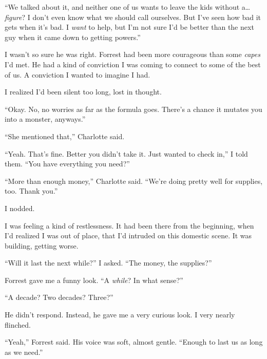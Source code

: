 ``We talked about it, and neither one of us wants to leave the kids without a\ldots \emph{figure}?  I don't even know what we should call ourselves.  But I've seen how bad it gets when it's bad.  I \emph{want} to help, but I'm not sure I'd be better than the next guy when it came down to getting powers.''



I wasn't so sure he was right.  Forrest had been more courageous than some \emph{capes} I'd met.  He had a kind of conviction I was coming to connect to some of the best of us.  A conviction I wanted to imagine I had.



I realized I'd been silent too long, lost in thought.



``Okay.  No, no worries as far as the formula goes.  There's a chance it mutates you into a monster, anyways.''



``She mentioned that,'' Charlotte said.



``Yeah.  That's fine.  Better you didn't take it.  Just wanted to check in,'' I told them.  ``You have everything you need?''



``More than enough money,'' Charlotte said.  ``We're doing pretty well for supplies, too.  Thank you.''



I nodded.



I was feeling a kind of restlessness.  It had been there from the beginning, when I'd realized I was out of place, that I'd intruded on this domestic scene.  It was building, getting worse.



``Will it last the next while?'' I asked.  ``The money, the supplies?''



Forrest gave me a funny look.  ``A \emph{while}?  In what sense?''



``A decade?  Two decades?  Three?''



He didn't respond.  Instead, he gave me a very curious look.  I very nearly flinched.



``Yeah,'' Forrest said.  His voice was soft, almost gentle.  ``Enough to last us as long as we need.''




